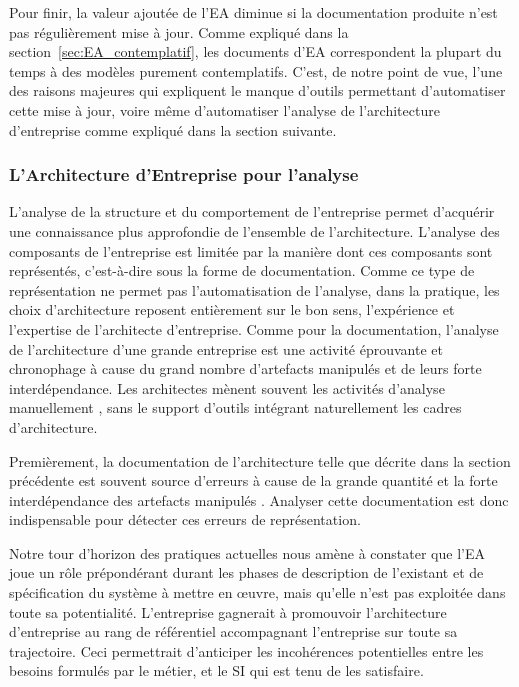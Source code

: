 Pour finir, la valeur ajoutée de l'EA diminue si la documentation produite
n'est pas régulièrement mise à jour. Comme expliqué dans la
section~\ref{sec:EA_contemplatif}, les documents d'EA correspondent la plupart
du temps à des modèles purement contemplatifs. C'est, de notre point de vue,
l'une des raisons majeures qui expliquent le manque d'outils permettant
d'automatiser cette mise à jour, voire même d'automatiser l'analyse de
l'architecture d'entreprise comme expliqué dans la section suivante.

\subsubsection{L'Architecture d'Entreprise pour l'analyse}
\label{sec:EA_analyse_limite}


L'analyse de la structure et du comportement de l'entreprise permet d'acquérir
une connaissance plus approfondie de l'ensemble de l'architecture. L'analyse des
composants de l'entreprise est limitée par la manière dont ces composants sont
représentés, c'est-à-dire sous la forme de documentation. Comme ce type de
représentation ne permet pas l'automatisation de l'analyse, dans la pratique,
les choix d'architecture reposent entièrement sur le bon sens, l'expérience et
l'expertise de l'architecte d'entreprise. Comme pour la documentation, l'analyse
de l'architecture d'une grande entreprise est une activité éprouvante et
chronophage à cause du grand nombre d'artefacts manipulés et de leurs forte
interdépendance. Les architectes mènent souvent les activités d'analyse
manuellement \cite{barn2013enterprise}, sans le support d'outils intégrant
naturellement les cadres d'architecture.

Premièrement, la documentation de l'architecture telle que décrite dans la
section précédente est souvent source d'erreurs à cause de la grande quantité
et la forte interdépendance des artefacts manipulés
\cite{kaisler_enterprise_2005}. Analyser cette documentation est donc
indispensable pour détecter ces erreurs de représentation.

Notre tour d'horizon des pratiques actuelles nous amène à constater que l'EA
joue un rôle prépondérant durant les phases de description de l'existant et de
spécification du système à mettre en œuvre, mais qu'elle n'est pas exploitée
dans toute sa potentialité. L'entreprise gagnerait à promouvoir l'architecture
d'entreprise au rang de référentiel accompagnant l'entreprise sur toute sa
trajectoire. Ceci permettrait d'anticiper les incohérences potentielles entre
les besoins formulés par le métier, et le SI qui est tenu de les satisfaire.


